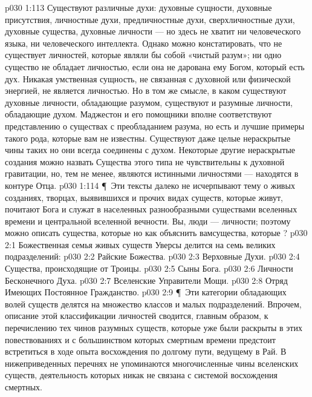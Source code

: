 \vs p030 1:113 Существуют различные духи: духовные сущности, духовные присутствия, личностные духи, предличностные духи, сверхличностные духи, духовные существа, духовные личности --- но здесь не хватит ни человеческого языка, ни человеческого интеллекта. Однако можно констатировать, что не существует личностей, которые являли бы собой «чистый разум»; ни одно существо не обладает личностью, если она не дарована ему Богом, который есть дух. Никакая умственная сущность, не связанная с духовной или физической энергией, не является личностью. Но в том же смысле, в каком существуют духовные личности, обладающие разумом, существуют и разумные личности, обладающие духом. Маджестон и его помощники вполне соответствуют представлению о существах с преобладанием разума, но есть и лучшие примеры такого рода, которые вам не известны. Существуют даже целые нераскрытые чины таких  но они всегда соединены с духом. Некоторые другие нераскрытые создания можно назвать  Существа этого типа не чувствительны к духовной гравитации, но, тем не менее, являются истинными личностями --- находятся в контуре Отца.
\vs p030 1:114 \P\ Эти тексты далеко не исчерпывают тему о живых созданиях, творцах, выявившихся и прочих видах существ, которые живут, почитают Бога и служат в населенных разнообразными существами вселенных времени и центральной вселенной вечности. Вы, люди --- личности; поэтому можно описать существа, которые  но как объяснить вамсущества, которые  ?
\vs p030 2:1 Божественная семья живых существ Уверсы делится на семь великих подразделений:
\vs p030 2:2 \bibnobreakspace Райские Божества.
\vs p030 2:3 \bibnobreakspace Верховные Духи.
\vs p030 2:4 \bibnobreakspace Существа, происходящие от Троицы.
\vs p030 2:5 \bibnobreakspace Сыны Бога.
\vs p030 2:6 \bibnobreakspace Личности Бесконечного Духа.
\vs p030 2:7 \bibnobreakspace Вселенские Управители Мощи.
\vs p030 2:8 \bibnobreakspace Отряд Имеющих Постоянное Гражданство.
\vs p030 2:9 \P\ Эти категории обладающих волей существ делятся на множество классов и малых подразделений. Впрочем, описание этой классификации личностей сводится, главным образом, к перечислению тех чинов разумных существ, которые уже были раскрыты в этих повествованиях и с большинством которых смертным времени предстоит встретиться в ходе опыта восхождения по долгому пути, ведущему в Рай. В нижеприведенных перечнях не упоминаются многочисленные чины вселенских существ, деятельность которых никак не связана с системой восхождения смертных.

